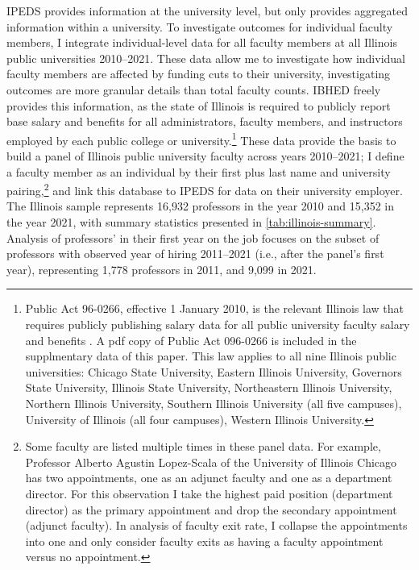 IPEDS provides information at the university level, but only provides aggregated information within a university.
To investigate outcomes for individual faculty members, I integrate individual-level data for all faculty members at all Illinois public universities 2010--2021.
These data allow me to investigate how individual faculty members are affected by funding cuts to their university, investigating outcomes are more granular details than total faculty counts.
IBHED freely provides this information, as the state of Illinois is required to publicly report base salary and benefits for all administrators, faculty members, and instructors employed by each public college or university.\footnote{
    Public Act 96-0266, effective 1 January 2010, is the relevant Illinois law that requires publicly publishing salary data for all public university faculty salary and benefits \citep{illinois-public-act}.
    A pdf copy of Public Act 096-0266 is included in the supplmentary data of this paper.
    This law applies to all nine Illinois public universities: Chicago State University, Eastern Illinois University, Governors State University, Illinois State University, Northeastern Illinois University, Northern Illinois University, Southern Illinois University (all five campuses), University of Illinois (all four campuses), Western Illinois University.
}
These data provide the basis to build a panel of Illinois public university faculty across years 2010--2021; I define a faculty member as an individual by their first plus last name and university pairing,\footnote{
    Some faculty are listed multiple times in these panel data.
    For example, Professor Alberto Agustin Lopez-Scala of the University of Illinois Chicago has two appointments, one as an adjunct faculty and one as a department director.
    For this observation I take the highest paid position (department director) as the primary appointment and drop the secondary appointment (adjunct faculty).
    In analysis of faculty exit rate, I collapse the appointments into one and only consider faculty exits as having a faculty appointment versus no appointment.
}
and link this database to IPEDS for data on their university employer.
The Illinois sample represents 16,932 professors in the year 2010 and 15,352 in the year 2021, with summary statistics presented in \autoref{tab:illinois-summary}.
Analysis of professors' in their first year on the job focuses on the subset of professors with observed year of hiring 2011--2021 (i.e., after the panel's first year), representing 1,778 professors in 2011, and 9,099 in 2021.

